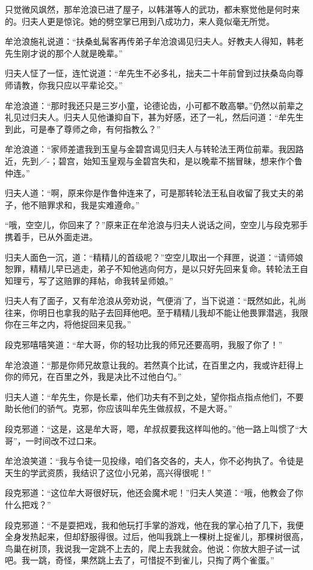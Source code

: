 \documentclass[12pt,oneside]{book}
\begin{document}
只觉微风飒然，那牟沧浪已进了屋子，以韩湛等人的武功，都未察觉他是何时来的。归夫人更是惊诧。她的劈空掌已用到八成功力，来人竟似毫无所觉。

牟沧浪施礼说道：``扶桑虬髯客再传弟子牟沧浪谒见归夫人。好教夫人得知，韩老先生刚才说的那个人就是晚辈。''

归夫人怔了一怔，连忙说道：``牟先生不必多礼，拙夫二十年前曾到过扶桑岛向尊师请教，你我只应以平辈论交。''

牟沧浪道：``那时我还只是三岁小童，论德论齿，小可都不敢高攀。''仍然以前辈之礼见过归夫人。归夫人见他谦抑自下，甚为好感，还了一礼，然后问道：``牟先生到此，可是奉了尊师之命，有何指教么？''

牟沧浪道：``家师差遣我到玉皇与金碧宫谒见归夫人与转轮法王两位前辈。我因路近，先到／-；碧宫，始知玉皇观与金碧宫失和，是以晚辈不揣冒昧，想来作个鲁仲连。''

归夫人道：``啊，原来你是作鲁仲连来了，可是那转轮法王私自收留了我丈夫的弟子，他不赔罪求和，我是实难遵命。''

``哦，空空儿，你回来了？''原来正在牟沧浪与归夫人说话之间，空空儿与段克邪手携着手，已从外面走进。

归夫人面色一沉，道：``精精儿的首级呢？''空空儿取出一个拜匣，说道：``请师娘恕罪，精精儿早已逃走，弟子不知他逃向何方，是以只好先回来复命。转轮法王自知理亏，写了这赔罪的拜帖，命我转呈师娘。''

归夫人有了面子，又有牟沧浪从旁劝说，气便消'了，当下说道：``既然如此，礼尚往来，你明日也拿我的贴子去回拜他吧。至于精精儿我却不能让他畏罪潜逃，我限你在三年之内，将他捉回来见我。''

段克邪嘻嘻笑道：``牟大哥，你的轻功比我的师兄还要高明，我服了你了！''

牟沧浪道：``那是你师兄故意让我的。若然真个比试，在百里之内，我或许赶得上你的师兄，在百里之外，我是决比不过他白勺。''

归夫人道：``牟先生，你是长辈，他们功夫有不到之处，望你指点指点他们，不要助长他们的骄气。克邪，你应该叫牟先生做叔叔，不是大哥。''

段克邪道：``这是，这是牟大哥，嗯，牟叔叔要我这样叫他的。''他一路上叫惯了``大哥''，一时间改不过口来。

牟沧浪笑道：``我与令徒一见投缘，咱们各交各的，夫人，你不必拘执了。令徒是天生的学武资质，我结识了这位小兄弟，高兴得很呢！''

段克邪道：``这位牟大哥很好玩，他还会魔术呢！''归夫人笑道：``哦，他教会了你什么把戏？''

段克邪道：``不是耍把戏，我和他玩打手掌的游戏，他在我的掌心拍了几下，我便全身发热起来，但却舒服得很。过后，他叫我跳上一棵树上捉雀儿，那棵树很高，鸟巢在树顶，我说我一定跳不上去的，爬上去我就会。他说：你放大胆子试一试吧。我一跳，奇怪，果然跳上去了，可惜捉不到雀儿，只掏了两个雀蛋。''
\end{document}
